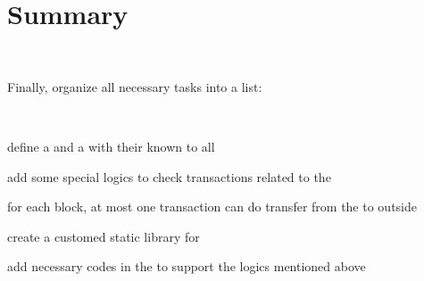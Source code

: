 \clearpage

\section{Summary}

~\par

Finally, organize all necessary tasks into a list:

~\par

\begin{ENUMERATE}
\item define a  and a  with their  known to all
    \item add some special logics to check transactions related to the 
    \item for each block, at most one transaction can do transfer from the  to outside
    \item create a customed  static library for 
    \item add necessary codes in the  to support the logics mentioned above
\end{ENUMERATE}
